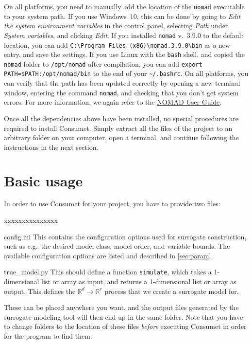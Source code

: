\documentclass[a4paper,bibliography=numbered]{scrartcl}
\begin{document}
On all platforms, you need to manually add the location of the \texttt{nomad} executable to your system path.
If you use Windows~10, this can be done by going to \emph{Edit the system environment variables} in the control panel, selecting \emph{Path} under \emph{System variables}, and clicking \emph{Edit}.
If you installed \texttt{nomad} v.~3.9.0 to the default location, you can add \verb|C:\Program Files (x86)|\verb|\nomad.3.9.0\bin| as a new entry, and save the settings.
If you use Linux with the \texttt{bash} shell, and copied the \texttt{nomad} folder to \texttt{/opt}\texttt{/nomad} after compilation, you can add \texttt{export} \texttt{PATH=\$PATH:/opt}\texttt{/nomad/bin} to the end of your \texttt{\textasciitilde/.bashrc}.
On all platforms, you can verify that the path has been updated correctly by opening a new terminal window, entering the command \texttt{nomad}, and checking that you don't get system errors.
For more information, we again refer to the \href{https://sourceforge.net/projects/nomad-bb-opt/files/user_guide.pdf/download}{NOMAD User Guide}.

Once all the dependencies above have been installed, no special procedures are required to install Consumet.
Simply extract all the files of the project to an arbitrary folder on your computer, open a terminal, and continue following the instructions in the next section.



\section{Basic usage}\label{sec:basic}
In order to use Consumet for your project, you have to provide two files:
\begin{labeling}{xxxxxxxxxxxxxxx}
    \item[config.ini]
        This contains the configuration options used for surrogate construction, such as e.g.\ the desired model class, model order, and variable bounds.
        The available configuration options are listed and described in \cref{sec:param}.
    \item[true\_model.py]
        This should define a function \texttt{simulate}, which takes a 1-dimensional list or array as input, and returns a 1-dimensional list or array as output.
        This defines the $\mathbb{R}^d \rightarrow \mathbb{R}^r$ process that we create a surrogate model for.
\end{labeling}
These can be placed anywhere you want, and the output files generated by the surrogate modeling tool will then end up in the same folder.
Note that you have to change folders to the location of these files \emph{before} executing Consumet in order for the program to find them.
\end{document}
